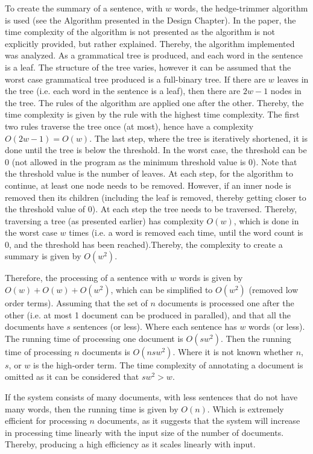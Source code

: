 \par To create the summary of a sentence, with $w$ words, the hedge-trimmer algorithm is used (see the Algorithm presented in the Design Chapter). In the paper, the time complexity of the algorithm is not presented as the algorithm is not explicitly provided, but rather explained. Thereby, the algorithm implemented was analyzed. As a grammatical tree is produced, and each word in the sentence is a leaf. The structure of the tree varies, however it can be assumed that the worst case grammatical tree produced is a full-binary tree. If there are $w$ leaves in the tree (i.e. each word in the sentence is a leaf), then there are $2w-1$ nodes in the tree. The rules of the algorithm are applied one after the other. Thereby, the time complexity is given by the rule with the highest time complexity. The first two rules traverse the tree once (at most), hence have a complexity $O(2w-1) = O(w)$. The last step, where the tree is iteratively shortened, it is done until the tree is below the threshold. In the worst case, the threshold can be 0 (not allowed in the program as the minimum threshold value is 0). Note that the threshold value is the number of leaves. At each step, for the algorithm to continue, at least one node needs to be removed. However, if an inner node is removed then its children (including the leaf is removed, thereby getting closer to the threshold value of 0). At each step the tree needs to be traversed. Thereby, traversing a tree (as presented earlier) has complexity $O(w)$, which is done in the worst case $w$ times (i.e. a word is removed each time, until the word count is 0, and the threshold has been reached).Thereby, the complexity to create a summary is given by $O(w^2)$.
\par Therefore, the processing of a sentence with $w$ words is given by $O(w)+O(w)+O(w^2)$, which can be simplified to $O(w^2)$ (removed low order terms). Assuming that the set of $n$ documents is processed one after the other (i.e. at most 1 document can be produced in paralled), and that all the documents have $s$ sentences (or less). Where each sentence has $w$ words (or less). The running time of processing one document is $O(sw^2)$. Then the running time of processing $n$ documents is $O(nsw^2)$. Where it is not known whether $n$, $s$, or $w$ is the high-order term. The time complexity of annotating a document is omitted as it can be considered that $sw^2 > w$.
\par If the system consists of many documents, with less sentences that do not have many words, then the running time is given by $O(n)$. Which is extremely efficient for processing $n$ documents, as it suggests that the system will increase in processing time linearly with the input size of the number of documents. Thereby, producing a high efficiency as it scales linearly with input.

